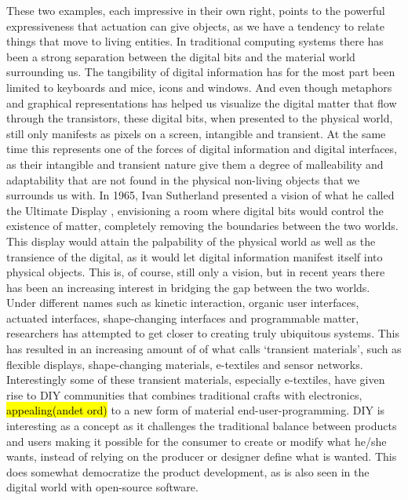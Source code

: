 These two examples, each impressive in their own right, points to the powerful expressiveness that actuation can give objects, as we have a tendency to relate things that move to living entities. 
\blank
In traditional computing systems there has been a strong separation between the digital bits and the material world surrounding us.
The tangibility of digital information has for the most part been limited to keyboards and mice, icons and windows. 
And even though metaphors and graphical representations has helped us visualize the digital matter that flow through the transistors, these digital bits, when presented to the physical world, still only manifests as pixels on a screen, intangible and transient.
At the same time this represents one of the forces of digital information and digital interfaces, as their intangible and transient nature give them a degree of malleability and adaptability that are not found in the physical non-living objects that we surrounds us with. 
\blank
In 1965, Ivan Sutherland presented a vision of what he called the Ultimate Display \citep{sutherland1965ultimate}, envisioning a room where digital bits would control the existence of matter, completely removing the boundaries between the two worlds.
This display would attain the palpability of the physical world as well as the transience of the digital, as it would let digital information manifest itself into physical objects.
This is, of course, still only a vision, but in recent years there has been an increasing interest in bridging the gap between the two worlds.
Under different names such as kinetic interaction, organic user interfaces, actuated interfaces, shape-changing interfaces and programmable matter, researchers has attempted to get closer to creating truly ubiquitous systems.    
This has resulted in an increasing amount of of what \citet{coelho2009programming} calls `transient materials', such as flexible displays, shape-changing materials, e-textiles and sensor networks.
\blank
Interestingly some of these transient materials, especially e-textiles, have given rise to DIY communities that combines traditional crafts with electronics, \hl{appealing(andet ord)} to a new form of material end-user-programming.
DIY is interesting as a concept as it challenges the traditional balance between products and users making it possible for the consumer to create  or modify what he/she wants, instead of relying on the producer or designer define what is wanted.
This does somewhat democratize the product development, as is also seen in the digital world with open-source software.
